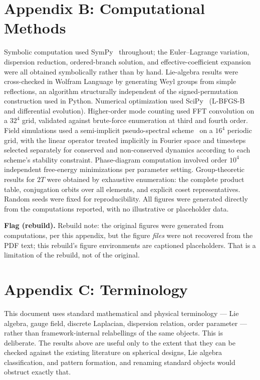 \documentclass[11pt,a4paper]{article}
\newcommand{\flagbox}[1]{\par\smallskip\noindent\textbf{Flag (rebuild).} #1\par\smallskip}
\begin{document}
\section{Appendix B: Computational Methods}
Symbolic computation used SymPy~\cite{meurer2017} throughout; the Euler--Lagrange variation, dispersion reduction, ordered-branch solution, and effective-coefficient expansion were all obtained symbolically rather than by hand. Lie-algebra results were cross-checked in Wolfram Language by generating Weyl groups from simple reflections, an algorithm structurally independent of the signed-permutation construction used in Python. Numerical optimization used SciPy~\cite{virtanen2020} (L-BFGS-B and differential evolution). Higher-order mode counting used FFT convolution on a $32^4$ grid, validated against brute-force enumeration at third and fourth order. Field simulations used a semi-implicit pseudo-spectral scheme~\cite{trefethen2000} on a $16^4$ periodic grid, with the linear operator treated implicitly in Fourier space and timesteps selected separately for conserved and non-conserved dynamics according to each scheme's stability constraint. Phase-diagram computation involved order $10^4$ independent free-energy minimizations per parameter setting. Group-theoretic results for $2T$ were obtained by exhaustive enumeration: the complete product table, conjugation orbits over all elements, and explicit coset representatives. Random seeds were fixed for reproducibility. All figures were generated directly from the computations reported, with no illustrative or placeholder data.
\flagbox{Rebuild note: the original figures were generated from computations, per this appendix, but the figure \emph{files} were not recovered from the PDF text; this rebuild's figure environments are captioned placeholders. That is a limitation of the rebuild, not of the original.}

\section{Appendix C: Terminology}
This document uses standard mathematical and physical terminology --- Lie algebra, gauge field, discrete Laplacian, dispersion relation, order parameter --- rather than framework-internal relabellings of the same objects. This is deliberate. The results above are useful only to the extent that they can be checked against the existing literature on spherical designs, Lie algebra classification, and pattern formation, and renaming standard objects would obstruct exactly that.
\end{document}
